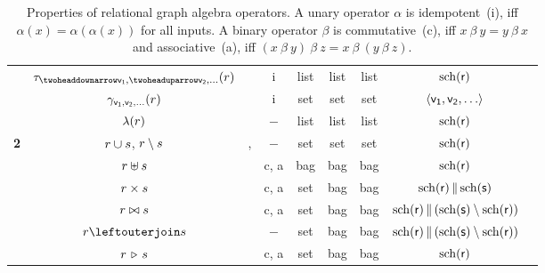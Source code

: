\begin{table}[htb]
\begin{tabular}{||c||c|c|c||c|c|c||c||c||}
		&                     $\sort{\desc \atom{v_1}, \asc \atom{v_2}, \ldots} (r)$                     &                 \sorttext                 &      i      &  list   &  list   &       list       &                     $\mathrm{sch}(\mathsf{r})$                     \\ \cline{2-8}
		&          $\gamma_{\mathsf{v_1, v_2, \ldots}} (r)$          &               \groupingtext               &      i      &   set   &   set   &       set        &         $\langle \mathsf{v_1, v_2, \ldots} \rangle$          \\ \cline{2-8}
		&                     $\lambda (r)$                      &                 \toptext                  &     $-$     &  list   &  list   &       list       &                     $\mathrm{sch}(\mathsf{r})$                     \\ \hline\hline
		\multirow{5}{*}{\bf 2}   & $r \cup s$, $r \setminus s$ & \uniontext, \minustext &     $-$     &   set   &   set   &       set        &                     $\mathrm{sch}(\mathsf{r})$                     \\ \cline{2-8}
		&                    $r \uplus s$                    &               \baguniontext               &    c, a     &   bag   &   bag   &       bag        &                     $\mathrm{sch}(\mathsf{r})$                     \\ \cline{2-8}
		&               $r \times s$               &           \cartesianproducttext           &    c, a     &   set   &   bag   &       bag        &           $\mathrm{sch}(\mathsf{r}) \,\|\, \mathrm{sch}(\mathsf{s})$            \\ \cline{2-8}
		&                    $r \bowtie s$                      &                 \jointext                 &    c, a     &   set   &   bag   &       bag        & $\mathrm{sch}(\mathsf{r}) \,\|\, (\mathrm{sch}(\mathsf{s}) \setminus \mathrm{sch}(\mathsf{r})) $ \\ \cline{2-8}
		&                $r \myleftouterjoin s$                 &            \leftouterjointext             &     $-$     &   set   &   bag   &       bag        & $\mathrm{sch}(\mathsf{r}) \,\|\, (\mathrm{sch}(\mathsf{s}) \setminus \mathrm{sch}(\mathsf{r})) $ \\ \cline{2-8}
		&                   $r \, \triangleright \, s$                   &               \antijointext               &    c, a     &   set   &   bag   &       bag        &                     $\mathrm{sch}(\mathsf{r})$                     \\ \cline{1-8}
	\end{tabular}
	\caption{Properties of relational graph algebra operators. A unary operator $\alpha$ is idempotent~(i), iff $\alpha(x) = \alpha(\alpha(x))$ for all inputs. A binary operator $\beta$ is commutative~(c), iff $x~\beta~y = y~\beta~x$ and associative~(a), iff $(x~\beta~y)~\beta~z = x~\beta~(y~\beta~z)$.}
	\label{table:collections}
\end{table}
